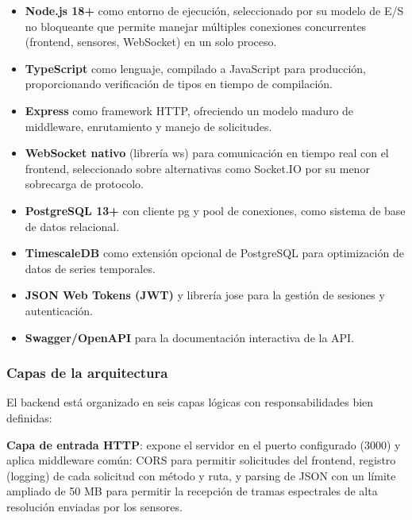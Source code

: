 \begin{itemize}
    \item \textbf{Node.js 18+} como entorno de ejecución, seleccionado por su
    modelo de E/S no bloqueante que permite manejar múltiples conexiones
    concurrentes (frontend, sensores, WebSocket) en un solo proceso.

    \item \textbf{TypeScript} como lenguaje, compilado a JavaScript para
    producción, proporcionando verificación de tipos en tiempo de compilación.

    \item \textbf{Express} como framework HTTP, ofreciendo un modelo maduro de
    middleware, enrutamiento y manejo de solicitudes.

    \item \textbf{WebSocket nativo} (librería ws) para comunicación en tiempo
    real con el frontend, seleccionado sobre alternativas como Socket.IO por su
    menor sobrecarga de protocolo.

    \item \textbf{PostgreSQL 13+} con cliente pg y pool de conexiones, como
    sistema de base de datos relacional.

    \item \textbf{TimescaleDB} como extensión opcional de PostgreSQL para
    optimización de datos de series temporales.

    \item \textbf{JSON Web Tokens (JWT)} y librería jose para la gestión de
    sesiones y autenticación.

    \item \textbf{Swagger/OpenAPI} para la documentación interactiva de la API.
\end{itemize}

\subsubsection*{Capas de la arquitectura}

El backend está organizado en seis capas lógicas con responsabilidades bien
definidas:

\textbf{Capa de entrada HTTP}: expone el servidor en el puerto configurado
(3000) y aplica middleware común: CORS para permitir solicitudes del frontend,
registro (logging) de cada solicitud con método y ruta, y parsing de JSON con
un límite ampliado de 50 MB para permitir la recepción de tramas espectrales
de alta resolución enviadas por los sensores.

